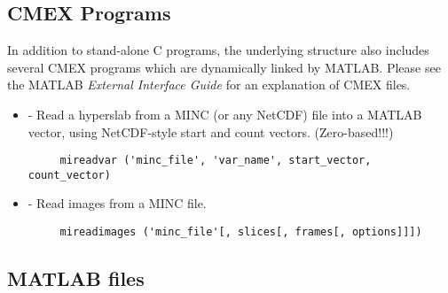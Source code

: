 \subsection{CMEX Programs}

In addition to stand-alone C programs, the underlying structure also includes
several CMEX programs which are dynamically linked by MATLAB.  Please see the
MATLAB {\em External Interface Guide} for an explanation of CMEX files.

\begin{itemize}

\item {} - Read a hyperslab from a MINC (or any NetCDF) file into a MATLAB
    vector, using NetCDF-style start and count vectors.  (Zero-based!!!)  
\begin{verbatim}
     mireadvar ('minc_file', 'var_name', start_vector, count_vector)
\end{verbatim}

\item {} - Read images from a MINC file.
\begin{verbatim}
     mireadimages ('minc_file'[, slices[, frames[, options]]]) 
\end{verbatim}

\end{itemize}


\subsection{MATLAB files}
\label{emma_reference}


% 




